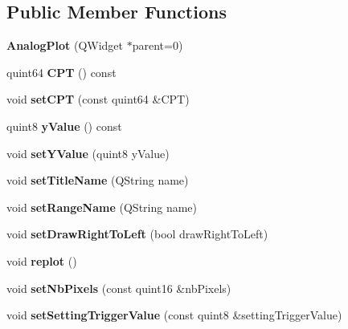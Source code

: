 \subsection*{Public Member Functions}
\begin{DoxyCompactItemize}
\item 
\mbox{\label{class_analog_plot_ae2b482baa376006f754ce47e427bca99}} 
{\bfseries Analog\+Plot} (Q\+Widget $\ast$parent=0)
\item 
\mbox{\label{class_analog_plot_ac40ef6c390ebddcf2f97db92504933a3}} 
quint64 {\bfseries C\+PT} () const
\item 
\mbox{\label{class_analog_plot_aca30d7d775350eb21dc7ed778c662791}} 
void {\bfseries set\+C\+PT} (const quint64 \&C\+PT)
\item 
\mbox{\label{class_analog_plot_a4b8726cf133454fef1e4e574ec31d738}} 
quint8 {\bfseries y\+Value} () const
\item 
\mbox{\label{class_analog_plot_a37ffe03ce1311324f84e651b7bc3ba51}} 
void {\bfseries set\+Y\+Value} (quint8 y\+Value)
\item 
\mbox{\label{class_analog_plot_aad00ba9042f5301bf819d3c636876110}} 
void {\bfseries set\+Title\+Name} (Q\+String name)
\item 
\mbox{\label{class_analog_plot_a1723c65e226ca1872d224e838c1bd4b1}} 
void {\bfseries set\+Range\+Name} (Q\+String name)
\item 
\mbox{\label{class_analog_plot_ac0f50464fd98d85f1e193dce931ebac6}} 
void {\bfseries set\+Draw\+Right\+To\+Left} (bool draw\+Right\+To\+Left)
\item 
\mbox{\label{class_analog_plot_aa9fef49a4219698979180ed3c4325611}} 
void {\bfseries replot} ()
\item 
\mbox{\label{class_analog_plot_a2bbfe7cd40b4dc16a3b09c03a7001c44}} 
void {\bfseries set\+Nb\+Pixels} (const quint16 \&nb\+Pixels)
\item 
\mbox{\label{class_analog_plot_a26b2f43521292ec8a9d6965d05841b6d}} 
void {\bfseries set\+Setting\+Trigger\+Value} (const quint8 \&setting\+Trigger\+Value)
\end{DoxyCompactItemize}


